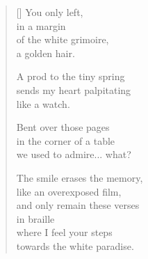 \documentclass[twocolumn,12pt]{article}
\begin{document}
\begin{verse}[\versewidth]
  You only left, \\
  in a margin \\
  of the white grimoire, \\
  a golden hair.

  A prod to the tiny spring \\
  sends my heart palpitating \\
  like a watch.

  Bent over those pages \\
  in the corner of a table \\
  we used to admire... what?

  The smile erases the memory, \\
  like an overexposed film, \\
  and only remain these verses \\
  in braille \\
  where I feel your steps \\
  towards the white paradise.
\end{verse}
\end{document}

